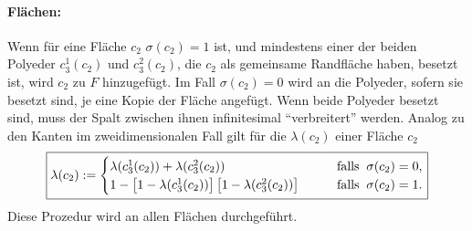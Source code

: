 \paragraph{Fl\"achen:}
Wenn f\"ur eine Fl\"ache $c_2$ $\sigma(c_2)=1$ ist, und mindestens einer der beiden Polyeder $c_3^1(c_2)$ und $c_3^2(c_2)$, die $c_2$ als gemeinsame Randfl\"ache haben, besetzt ist, wird $c_2$ zu $F$ hinzugef\"ugt. Im Fall $\sigma(c_2)=0$ wird an die Polyeder, sofern sie besetzt sind, je eine Kopie der Fl\"ache angef\"ugt. Wenn beide Polyeder besetzt sind, muss der Spalt zwischen ihnen infinitesimal ``verbreitert'' werden. Analog zu den Kanten im zweidimensionalen Fall gilt f\"ur die $\lambda(c_2)$ einer Fl\"ache $c_2$
\begin{equation}
\fbox{$\displaystyle  \lambda(c_2):=\begin{cases} \lambda(c_3^1(c_2))+ \lambda(c_3^2(c_2)) \qquad & \text{falls}\;\; \sigma(c_2)=0, \\
 1-\left[1-\lambda(c_3^1(c_2))\right]\left[1-\lambda(c_3^2(c_2))\right] \qquad & \text{falls} \;\; \sigma(c_2)=1.\end{cases}$}
\end{equation}
Diese Prozedur wird an allen Fl\"achen durchgef\"uhrt.
